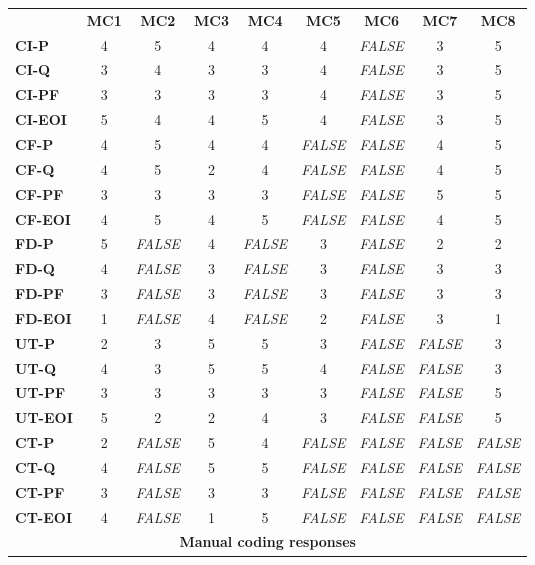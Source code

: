 \documentclass[final_report_innit.tex]{subfiles}
\begin{document}
\begin{center}
\begin{tabular}[b]{l | c | c | c | c | c | c | c | c}
	& \textbf{MC1} & \textbf{MC2} & \textbf{MC3} & \textbf{MC4} & \textbf{MC5} & \textbf{MC6} & \textbf{MC7} & \textbf{MC8} \\ %
	\textbf{CI-P} & 4 & 5 & 4 & 4 & 4 & \textit{FALSE} & 3 & 5 \\ %
	\textbf{CI-Q} & 3 & 4 & 3 & 3 & 4 & \textit{FALSE} & 3 & 5 \\ %
	\textbf{CI-PF} & 3 & 3 & 3 & 3 & 4 & \textit{FALSE} & 3 & 5 \\ %
	\textbf{CI-EOI} & 5 & 4 & 4 & 5 & 4 & \textit{FALSE} & 3 & 5 \\ %
	\textbf{CF-P} & 4 & 5 & 4 & 4 & \textit{FALSE} & \textit{FALSE} & 4 & 5 \\ %
	\textbf{CF-Q} & 4 & 5 & 2 & 4 & \textit{FALSE} & \textit{FALSE} & 4 & 5 \\ %
	\textbf{CF-PF} & 3 & 3 & 3 & 3 & \textit{FALSE} & \textit{FALSE} & 5 & 5 \\ %
	\textbf{CF-EOI} & 4 & 5 & 4 & 5 & \textit{FALSE} & \textit{FALSE} & 4 & 5 \\ %
	\textbf{FD-P} & 5 & \textit{FALSE} & 4 & \textit{FALSE} & 3 & \textit{FALSE} & 2 & 2 \\ %
	\textbf{FD-Q} & 4 & \textit{FALSE} & 3 & \textit{FALSE} & 3 & \textit{FALSE} & 3 & 3 \\ %
	\textbf{FD-PF} & 3 & \textit{FALSE} & 3 & \textit{FALSE} & 3 & \textit{FALSE} & 3 & 3 \\ %
	\textbf{FD-EOI} & 1 & \textit{FALSE} & 4 & \textit{FALSE} & 2 & \textit{FALSE} & 3 & 1 \\ %
	\textbf{UT-P} & 2 & 3 & 5 & 5 & 3 & \textit{FALSE} & \textit{FALSE} & 3 \\ %
	\textbf{UT-Q} & 4 & 3 & 5 & 5 & 4 & \textit{FALSE} & \textit{FALSE} & 3 \\ %
	\textbf{UT-PF} & 3 & 3 & 3 & 3 & 3 & \textit{FALSE} & \textit{FALSE} & 5 \\ %
	\textbf{UT-EOI} & 5 & 2 & 2 & 4 & 3 & \textit{FALSE} & \textit{FALSE} & 5 \\ %
	\textbf{CT-P} & 2 & \textit{FALSE} & 5 & 4 & \textit{FALSE} & \textit{FALSE} & \textit{FALSE} & \textit{FALSE} \\ %
	\textbf{CT-Q} & 4 & \textit{FALSE} & 5 & 5 & \textit{FALSE} & \textit{FALSE} & \textit{FALSE} & \textit{FALSE} \\ %
	\textbf{CT-PF} & 3 & \textit{FALSE} & 3 & 3 & \textit{FALSE} & \textit{FALSE} & \textit{FALSE} & \textit{FALSE} \\ %
	\textbf{CT-EOI} & 4 & \textit{FALSE} & 1 & 5 & \textit{FALSE} & \textit{FALSE} & \textit{FALSE} & \textit{FALSE} \\ %
	\multicolumn{9}{c}{\cellcolor{white} \textbf{Manual coding responses}} \\
\end{tabular}


\end{center}
\end{document}

